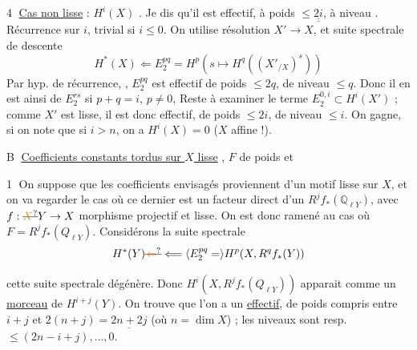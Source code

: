 \textcircled{4} \uline{Cas non lisse} : $H^i(X)$ . Je dis qu'il est effectif, à poids $\le\underline{\underline{2i}}$, à niveau  .  Récurrence sur $i$, trivial si $i\le 0$. On utilise résolution $X'\to X$, et suite spectrale de descente
\[
 H^*(X)\Longleftarrow E_2^{pq}=H^p(s\longmapsto H^q((X'_{/X})^s))
\]
 Par hyp. de récurrence,  , $E_2^{pq}$ est effectif
de  poids $\le 2q$, de niveau $\le q$. Donc il en est ainsi de $E^{rs}_2$ si $p+q=i$, $p\ne 0$,  Reste à examiner le terme $E^{0,i}_2\subset H^i(X')$ ; comme $X'$ est lisse, il est donc effectif, de poids $\le 2i$, de niveau $\le i$. On gagne\unsure{!}, si on note que si $i>n$, on a $H^i(X)=0$ ($X$ affine !).


\textcircled{B} \uline{Coefficients constants tordus sur $X$ lisse} , $F$  de poids et 

\textcircled{1} On suppose que les coefficients envisagés proviennent d'un motif lisse sur $X$, et  on va regarder le cas où ce dernier est un facteur direct d'un $R^jf_*(\mathbb Q_{\ell Y})$, avec $f:\deleted{\unsure{X}}Y\to X$ morphisme projectif et lisse.  On est donc ramené au cas où $F=R^jf_*(Q_{\ell Y})$.  Considérons la suite spectrale
\[
 H^*(Y)\deleted{\unsure{\Leftarrow}}\Longleftarrow \inserted{E^{pq}_2=}H^p(X,R^q f_*(Y))
\]

 cette suite spectrale dégénère. Donc $H^i(X,R^jf_*(Q_{\ell Y}))$  apparait comme un \uline{morceau} de $H^{i+j}(Y)$. On trouve que l'on a un  \uline{effectif}, de poids \deleted{\unsure{\#}} compris entre   \uline{$i+j$} et $2(n+j)=\underline{2n+2j}$ (où $n=\dim X$) ; les niveaux sont resp. $\le(2n-i+j),\ldots,0$.

